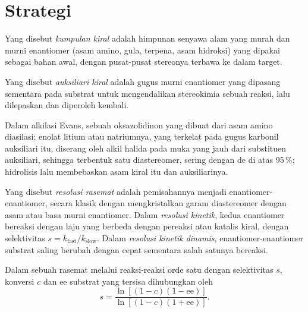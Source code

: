 \section{Strategi}

\begin{definition}\label{def:b3:asymmetric-synthesis:chiral-pool}
Yang disebut \emph{kumpulan kiral} adalah himpunan senyawa alam yang murah dan
murni enantiomer (asam amino, gula, terpena, asam hidroksi) yang dipakai sebagai
bahan awal, dengan pusat-pusat stereonya terbawa ke dalam target.
\end{definition}

\begin{definition}\label{def:b3:asymmetric-synthesis:auxiliary}
Yang disebut \emph{auksiliari kiral} adalah gugus murni enantiomer yang
dipasang sementara pada substrat untuk mengendalikan stereokimia sebuah
reaksi, lalu dilepaskan dan diperoleh kembali.
\end{definition}

Dalam alkilasi Evans, sebuah oksazolidinon yang dibuat dari asam amino diasilasi;
enolat litium atau natriumnya, yang terkelat pada gugus karbonil auksiliari itu,
diserang oleh alkil halida pada muka yang jauh dari substituen auksiliari,
sehingga terbentuk satu diastereomer, sering dengan de di atas 95\,\%; hidrolisis lalu membebaskan
asam kiral itu dan auksiliarinya.

\begin{definition}[Resolusi]\label{def:b3:asymmetric-synthesis:resolution}
Yang disebut \emph{resolusi rasemat} adalah
pemisahannya menjadi enantiomer-enantiomer, secara klasik dengan mengkristalkan garam diastereomer
dengan asam atau basa murni enantiomer. Dalam \emph{resolusi kinetik},
kedua enantiomer bereaksi dengan laju yang berbeda dengan pereaksi atau
katalis kiral, dengan selektivitas $s = k_{\mathrm{fast}}/k_{\mathrm{slow}}$. Dalam \emph{resolusi kinetik
dinamis}, enantiomer-enantiomer substrat
saling berubah dengan cepat sementara salah satunya bereaksi.
\end{definition}

\begin{theorem}\label{thm:b3:asymmetric-synthesis:kagan}
Dalam  sebuah rasemat melalui reaksi-reaksi orde satu dengan selektivitas $s$,
konversi $c$ dan ee substrat yang tersisa dihubungkan oleh
\[
  s = \frac{\ln[(1 - c)(1 - \mathrm{ee})]}{\ln[(1 - c)(1 + \mathrm{ee})]}.
\]
\end{theorem}


